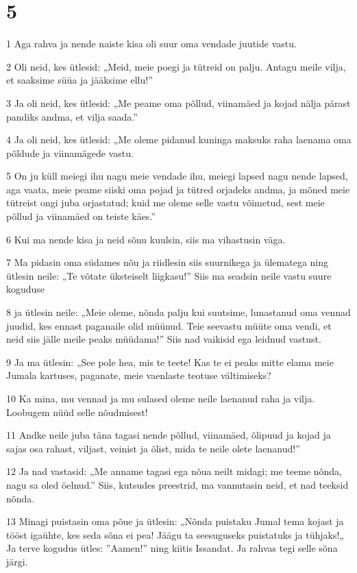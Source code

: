 \chapter{5}

\par 1 Aga rahva ja nende naiste kisa oli suur oma vendade juutide vastu.
\par 2 Oli neid, kes ütlesid: „Meid, meie poegi ja tütreid on palju. Antagu meile vilja, et saaksime süüa ja jääksime ellu!”
\par 3 Ja oli neid, kes ütlesid: „Me peame oma põllud, viinamäed ja kojad nälja pärast pandiks andma, et vilja saada.”
\par 4 Ja oli neid, kes ütlesid: „Me oleme pidanud kuninga maksuks raha laenama oma põldude ja viinamägede vastu.
\par 5 On ju küll meiegi ihu nagu meie vendade ihu, meiegi lapsed nagu nende lapsed, aga vaata, meie peame siiski oma pojad ja tütred orjadeks andma, ja mõned meie tütreist ongi juba orjastatud; kuid me oleme selle vastu võimetud, sest meie põllud ja viinamäed on teiste käes.”
\par 6 Kui ma nende kisa ja neid sõnu kuulsin, siis ma vihastusin väga.
\par 7 Ma pidasin oma südames nõu ja riidlesin siis suurnikega ja ülematega ning ütlesin neile: „Te võtate üksteiselt liigkasu!” Siis ma seadsin neile vastu suure koguduse
\par 8 ja ütlesin neile: „Meie oleme, nõnda palju kui suutsime, lunastanud oma vennad juudid, kes ennast paganaile olid müünud. Teie seevastu müüte oma vendi, et neid siis jälle meile peaks müüdama!” Siis nad vaikisid ega leidnud vastust.
\par 9 Ja ma ütlesin: „See pole hea, mis te teete! Kas te ei peaks mitte elama meie Jumala kartuses, paganate, meie vaenlaste teotuse vältimiseks?
\par 10 Ka mina, mu vennad ja mu sulased oleme neile laenanud raha ja vilja. Loobugem nüüd selle nõudmisest!
\par 11 Andke neile juba täna tagasi nende põllud, viinamäed, õlipuud ja kojad ja sajas osa rahast, viljast, veinist ja õlist, mida te neile olete laenanud!”
\par 12 Ja nad vastasid: „Me anname tagasi ega nõua neilt midagi; me teeme nõnda, nagu sa oled öelnud.” Siis, kutsudes preestrid, ma vannutasin neid, et nad teeksid nõnda.
\par 13 Minagi puistasin oma põue ja ütlesin: „Nõnda puistaku Jumal tema kojast ja tööst igaühte, kes seda sõna ei pea! Jäägu ta seesuguseks puistatuks ja tühjaks!„ Ja terve kogudus ütles: ”Aamen!” ning kiitis Issandat. Ja rahvas tegi selle sõna järgi.
